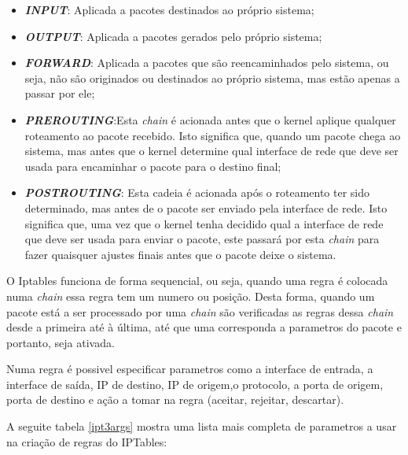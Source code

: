 \begin{itemize}
\item \textbf{\textit{INPUT}}: Aplicada a pacotes destinados ao próprio sistema;
\item \textbf{\textit{OUTPUT}}: Aplicada a pacotes gerados pelo próprio sistema;
\item \textbf{\textit{FORWARD}}: Aplicada a pacotes que são reencaminhados pelo sistema,
ou seja, não são originados ou destinados ao próprio sistema, mas estão apenas a passar
por ele;
\item \textbf{\textit{PREROUTING}}:Esta \textit{chain} é acionada antes que o kernel 
aplique qualquer roteamento ao pacote recebido. Isto significa que, quando um pacote 
chega ao sistema, mas antes que o kernel determine qual interface de rede que deve ser 
usada para encaminhar o pacote para o destino final;
\item \textbf{\textit{POSTROUTING}}: Esta cadeia é acionada após o roteamento 
ter sido determinado, mas antes de o pacote ser enviado pela interface de rede.
Isto significa que, uma vez que o kernel tenha decidido qual a interface de rede que
deve ser usada para enviar o pacote, este passará por esta \textit{chain} para fazer 
quaisquer ajustes finais antes que o pacote deixe o sistema.
\end{itemize}


O Iptables funciona de forma sequencial, ou seja, quando uma regra é colocada
numa \textit{chain} essa regra tem um numero ou posição. Desta forma, quando um 
pacote está a ser processado por uma \textit{chain} são verificadas as regras 
dessa \textit{chain} desde a primeira até à última, até que uma corresponda a
parametros do pacote e portanto, seja ativada.

Numa regra é possivel especificar parametros como a interface de entrada, 
a interface de saída, IP de destino, IP de origem,o protocolo, a porta de 
origem, porta de destino e ação a tomar na regra (aceitar, rejeitar, descartar).

A seguite tabela \ref{ipt3args} mostra uma lista mais completa de parametros a usar na
criação de regras do IPTables:

